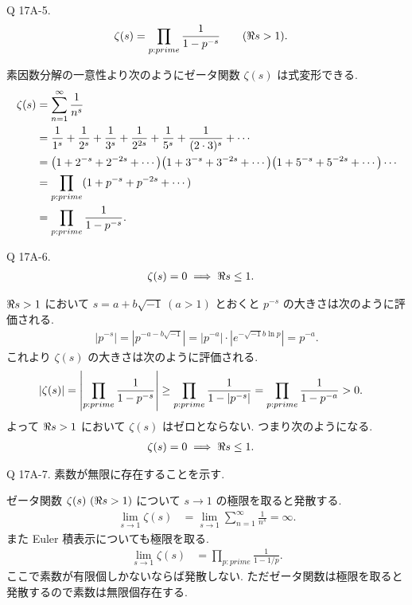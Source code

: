 \documentclass[uplatex,dvipdfmx,a4paper,11pt]{jlreq}
\theoremstyle{definition}
\begin{document}
\begin{itembox}[l]{Q 17A-5.}
  \begin{align}
    \zeta(s) & = \prod_{p:prime}\frac{1}{1 - p^{-s}} \qquad (\real s > 1).
  \end{align}
\end{itembox}
素因数分解の一意性より次のようにゼータ関数 $\zeta(s)$ は式変形できる.
\begin{align}
  \zeta(s) & = \sum_{n=1}^{\infty}\frac{1}{n^s}                                                                                   \\
           & = \frac{1}{1^s} + \frac{1}{2^s} + \frac{1}{3^s} + \frac{1}{2^{2s}} + \frac{1}{5^s} + \frac{1}{(2\cdot 3)^s} + \cdots \\
           & = \qty(1 + 2^{-s} + 2^{-2s} + \cdots)\qty(1 + 3^{-s} + 3^{-2s} + \cdots)\qty(1 + 5^{-s} + 5^{-2s} + \cdots)\cdots    \\
           & = \prod_{p:prime}(1 + p^{-s} + p^{-2s} + \cdots)                                                                     \\
           & = \prod_{p:prime}\frac{1}{1 - p^{-s}}.
\end{align}

\begin{itembox}[l]{Q 17A-6.}
  \begin{align}
    \zeta(s) & = 0 \implies \real s \leq 1.
  \end{align}
\end{itembox}

$\real s > 1$ において $s = a + b\sqrt{-1}\ (a > 1)$ とおくと $p^{-s}$ の大きさは次のように評価される.
\begin{align}
  |p^{-s}| = |p^{-a-b\sqrt{-1}}| = |p^{-a}|\cdot|e^{-\sqrt{-1}b\ln p}| = p^{-a}.
\end{align}
これより $\zeta(s)$ の大きさは次のように評価される.
\begin{align}
  |\zeta(s)| & = \qty|\prod_{p:prime}\frac{1}{1 - p^{-s}}| \geq \prod_{p:prime}\frac{1}{1 - |p^{-s}|} = \prod_{p:prime}\frac{1}{1 - p^{-a}} > 0.
\end{align}
よって $\real s > 1$ において $\zeta(s)$ はゼロとならない. つまり次のようになる.
\begin{align}
  \zeta(s) & = 0 \implies \real s \leq 1.
\end{align}

\begin{itembox}[l]{Q 17A-7.}
  素数が無限に存在することを示す.
\end{itembox}
ゼータ関数 $\zeta(s)\ (\real s > 1)$ について $s\to 1$ の極限を取ると発散する.
\begin{align}
  \lim_{s\to 1}\zeta(s) & = \lim_{s\to 1}\sum_{n=1}^{\infty}\frac{1}{n^s} = \infty.
\end{align}
また Euler 積表示についても極限を取る.
\begin{align}
  \lim_{s\to 1}\zeta(s) & = \prod_{p:prime}\frac{1}{1 - 1/p}.
\end{align}
ここで素数が有限個しかないならば発散しない. ただゼータ関数は極限を取ると発散するので素数は無限個存在する.
\end{document}
